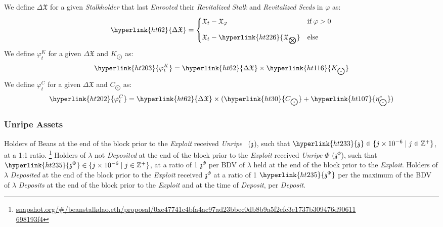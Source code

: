 \documentclass[tikz]{article}
\newcommand{\term}[1]{\textsl{#1}}
\newcommand{\Bean}{} %
\newcommand{\bean}{} %
\begin{document}
We define \hyperlink{ht62}{$\Delta \mathfrak{X}$} for a given \term{Stalkholder} that last \term{Enrooted} their \term{Revitalized} \term{Stalk} and \term{Revitalized} \term{Seeds} in \hyperlink{ht201}{$\varphi$} as:
$$\hyperlink{ht62}{\Delta \mathfrak{X}} = \begin{cases} \mathfrak{X}_{t} - \mathfrak{X}_\varphi & \text{if} \; \varphi > 0 \vspace{.3cm} \\ 
\mathfrak{X}_{t} - \hyperlink{ht226}{\mathfrak{X}_{\bigotimes}} & \text{else}\end{cases}$$
We define \hyperlink{ht203}{${\varphi}_t^K$} for a given \hyperlink{ht62}{$\Delta \mathfrak{X}$} and \hyperlink{ht116}{$K_{\bigodot}$} as:
$$\hyperlink{ht203}{{\varphi}_t^K} = \hyperlink{ht62}{\Delta \mathfrak{X}} \times \hyperlink{ht116}{K_{\bigodot}}$$
We define \hyperlink{ht202}{${\varphi}_t^C$} for a given \hyperlink{ht62}{$\Delta \mathfrak{X}$} and \hyperlink{ht30}{$C_{\bigodot}$} as:
$$\hyperlink{ht202}{{\varphi}_t^C} = \hyperlink{ht62}{\Delta \mathfrak{X}} \times (\hyperlink{ht30}{C_{\bigodot}} + \hyperlink{ht107}{\eta_{\bigodot}^c})$$

\subsubsection{Unripe Assets}
Holders of Beans at the end of the block prior to the \term{Exploit} received \term{Unripe} \Bean\ (\hyperlink{ht229}{$\mathfrak{z}^{\bean}$}), such that $\hyperlink{ht233}{\mathfrak{z}^{\bean}} \in \{j \times 10^{-6} \mid j \in \mathbb{Z}^{+} \}$, at a 1:1 ratio. \footnote{\href{https://snapshot.org/\#/beanstalkdao.eth/proposal/0xe47741c4bfa4ac97ad23bbec0db8b9a5f2efc3e1737b309476d90611698193f4}{snapshot.org/\#/beanstalkdao.eth/proposal/0xe47741c4bfa4ac97ad23bbec0db8b9a5f2efc3e1737b309476d90611\\698193f4}} Holders of \hyperlink{ht126}{$\lambda$} not \term{Deposited} at the end of the block prior to the \term{Exploit} received \term{Unripe} \hyperlink{ht187}{$\Phi$} (\hyperlink{ht235}{$\mathfrak{z}^{\Phi}$}), such that $\hyperlink{ht235}{\mathfrak{z}^{\Phi}} \in \{j \times 10^{-6} \mid j \in \mathbb{Z}^{+} \}$, at a ratio of 1 \hyperlink{ht235}{$\mathfrak{z}^{\Phi}$} per BDV of \hyperlink{ht126}{$\lambda$} held at the end of the block prior to the \term{Exploit}. Holders of \hyperlink{ht126}{$\lambda$} \term{Deposited} at the end of the block prior to the \term{Exploit} received \hyperlink{ht235}{$\mathfrak{z}^{\Phi}$} at a ratio of 1 $\hyperlink{ht235}{\mathfrak{z}^{\Phi}}$ per the maximum of the BDV of \hyperlink{ht126}{$\lambda$} \term{Deposits} at the end of the block prior to the \term{Exploit} and at the time of \term{Deposit}, per \term{Deposit}. 
\end{document}
